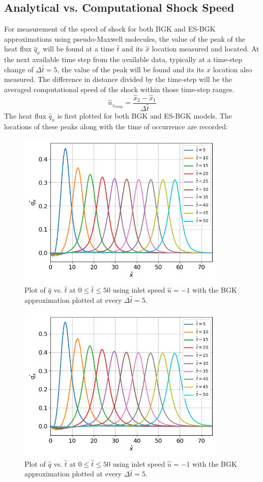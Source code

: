 \documentclass[a4paper]{article}
\begin{document}
\subsection{Analytical vs. Computational Shock Speed}
For measurement of the speed of shock for both BGK and ES-BGK approximations using pseudo-Maxwell molecules, the value of the peak of the heat flux $\hat{q}_x$ will be found at a time $\hat{t}$ and its $\hat{x}$ location measured and located. At the next available time step from the available data, typically at a time-step change of $\Delta\hat{t} = 5$, the value of the peak will be found and its its $\hat{x}$ location also measured. The difference in distance divided by the time-step will be the averaged computational speed of the shock within those time-step ranges.
\begin{equation}
    \hat{u}_{s_{comp}} = \dfrac{\hat{x}_2 - \hat{x}_1}{\Delta\hat{t}}
\end{equation}
The heat flux $\hat{q}_x$ is first plotted for both BGK and ES-BGK models. The locations of these peaks along with the time of occurrence are recorded: 
\begin{figure}[hbt!]
    \centering
    \includegraphics[width=10cm]{plots/problem_speed_BGK.png}
    \caption{\centering Plot of $\hat{q}$ vs. $\hat{t}$ at $0 \leq \hat{t} \leq 50$ using inlet speed $\hat{u} = -1$ with the BGK approximation plotted at every $\Delta\hat{t} = 5$.}
    \label{problem_speed_BGK}
\end{figure}
\begin{figure}[hbt!]
    \centering
    \includegraphics[width=10cm]{plots/problem_speed_ESBGK.png}
    \caption{\centering Plot of $\hat{q}$ vs. $\hat{t}$ at $0 \leq \hat{t} \leq 50$ using inlet speed $\hat{u} = -1$ with the BGK approximation plotted at every $\Delta\hat{t} = 5$.}
    \label{problem_speed_ESBGK}
\end{figure}
\end{document}
